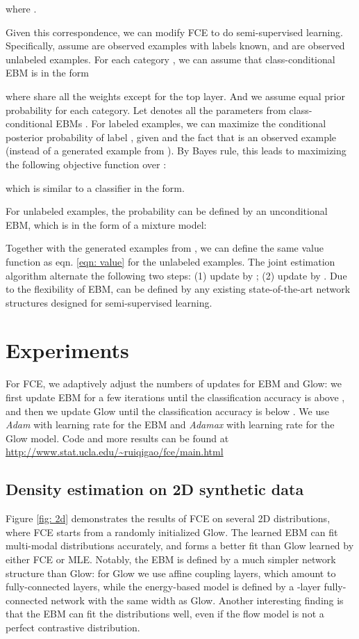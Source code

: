 \documentclass[10pt,twocolumn,letterpaper]{article}
\begin{document}
where . 



Given this correspondence, we can modify FCE to do semi-supervised learning. Specifically, assume  are observed examples with labels known, and  are observed unlabeled examples. For each category , we can assume that class-conditional EBM is in the form
  
where  share all the weights except for the top layer. And we assume equal prior probability for each category. Let  denotes all the parameters from class-conditional EBMs . For labeled examples, we can maximize the conditional posterior probability of label , given  and the fact that  is an observed example (instead of a generated example from ). By Bayes rule, this leads to maximizing the following objective function over :

which is similar to a classifier in the form. 

For unlabeled examples, the probability can be defined by an unconditional EBM, which is in the form of a mixture model:

Together with the generated examples from , we can define the same value function  as eqn. \ref{eqn: value} for the unlabeled examples. The joint estimation algorithm alternate the following two steps: (1) update  by ; (2) update  by . Due to the flexibility of EBM,  can be defined by any existing state-of-the-art network structures designed for semi-supervised learning. 
\section{Experiments}


For FCE, we adaptively adjust the numbers of updates for EBM and Glow: we first update EBM for a few iterations until the classification accuracy is above , and then we update Glow until the classification accuracy is below . We use \emph{Adam} \cite{kingma2014adam} with learning rate  for the EBM and \emph{Adamax} \cite{kingma2014adam} with learning rate  for the Glow model. Code and more results can be found at {\small \url{http://www.stat.ucla.edu/~ruiqigao/fce/main.html}}

\subsection{Density estimation on 2D synthetic data}
Figure \ref{fig: 2d} demonstrates the results of FCE on several 2D distributions, where FCE starts from a randomly initialized Glow. The learned EBM can fit multi-modal distributions accurately, and forms a better fit than Glow learned by either FCE or MLE. Notably, the EBM is defined by a much simpler network structure than Glow: for Glow we use  affine coupling layers, which amount to  fully-connected layers, while the energy-based model is defined by a -layer fully-connected network with the same width as Glow.  Another interesting finding is that the EBM can fit the distributions well, even if the flow model is not a perfect contrastive distribution.
\end{document}
